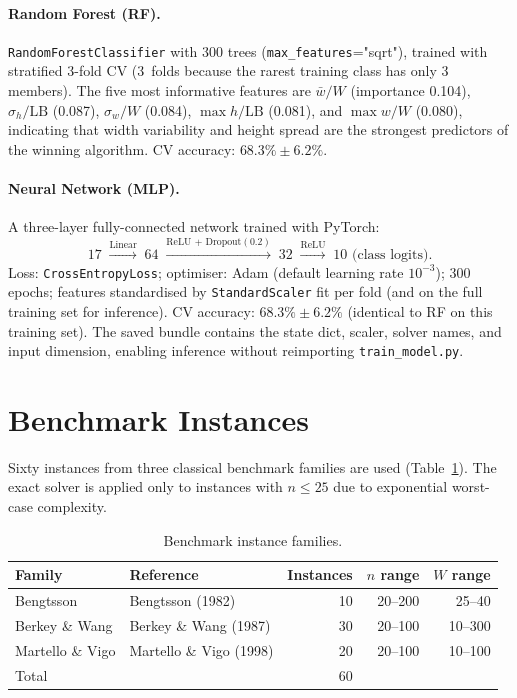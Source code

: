 \documentclass[11pt,a4paper]{article}
\begin{document}
\paragraph{Random Forest (RF).}
\texttt{RandomForestClassifier} with 300 trees (\texttt{max\_features}="sqrt"),
trained with stratified 3-fold CV (3~folds because the rarest training class
has only 3 members).
The five most informative features are $\bar{w}/W$ (importance 0.104),
$\sigma_h/\mathrm{LB}$ (0.087), $\sigma_w/W$ (0.084),
$\max h/\mathrm{LB}$ (0.081), and $\max w/W$ (0.080),
indicating that width variability and height spread are the strongest
predictors of the winning algorithm.
CV accuracy: $68.3\% \pm 6.2\%$.

\paragraph{Neural Network (MLP).}
A three-layer fully-connected network trained with PyTorch:
\[
  17 \;\xrightarrow{\text{Linear}}\; 64 \;\xrightarrow{\text{ReLU + Dropout}(0.2)}\;
  32 \;\xrightarrow{\text{ReLU}}\; 10 \text{ (class logits)}.
\]
Loss: \texttt{CrossEntropyLoss}; optimiser: Adam (default learning rate
$10^{-3}$); 300 epochs; features standardised by \texttt{StandardScaler} fit
per fold (and on the full training set for inference).
CV accuracy: $68.3\% \pm 6.2\%$ (identical to RF on this training set).
The saved bundle contains the state dict, scaler, solver names, and input
dimension, enabling inference without reimporting \texttt{train\_model.py}.

\section{Benchmark Instances}

Sixty instances from three classical benchmark families are used
(Table~\ref{tab:benchmarks}).
The exact solver is applied only to instances with $n \le 25$ due to
exponential worst-case complexity.

\begin{table}[h]
\centering
\caption{Benchmark instance families.}
\label{tab:benchmarks}
\begin{tabular}{llrrr}
\toprule
Family & Reference & Instances & $n$ range & $W$ range \\
\midrule
Bengtsson      & Bengtsson (1982)       & 10 & 20--200 & 25--40  \\
Berkey \& Wang & Berkey \& Wang (1987)  & 30 & 20--100 & 10--300 \\
Martello \& Vigo & Martello \& Vigo (1998) & 20 & 20--100 & 10--100 \\
\midrule
Total & & 60 & & \\
\bottomrule
\end{tabular}
\end{table}
\end{document}
